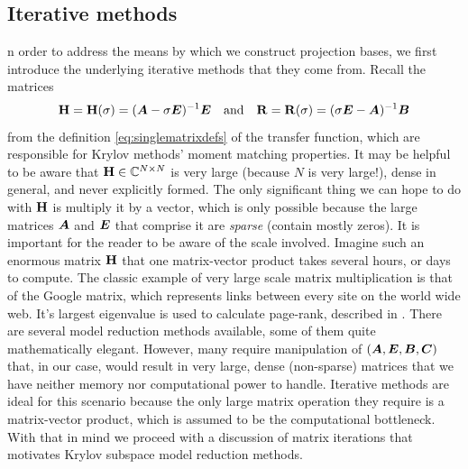 \subsection{Iterative methods}\label{sec:iterations}
n order to address the means by which we construct projection bases, we first introduce the underlying iterative methods that they come from.  Recall the matrices 
\[
\textbf{\textup{H}}=\textbf{\textup{H}}(\sigma) = (\bm{A} - \sigma \bm{E})^{-1}\bm{E}   \quad \text{and} \quad \textbf{\textup{R}}=\textbf{\textup{R}}(\sigma) =  (\sigma \bm{E}-\bm{A})^{-1}\bm{B}
\]
from the definition \eqref{eq:singlematrixdefs} of the transfer function,  which are responsible for Krylov methods' moment matching properties.  It may be helpful to be aware  that $\textbf{\textup{H}}\in\mathbb{C}^{N\times N}$ is very large (because $N$ is very large!), dense in general,  and never explicitly formed.   The only significant thing we can hope to do with $\textbf{\textup{H}}$ is multiply it by a vector, which is only possible because the large matrices $\bm{A}$ and $\bm{E}$ that comprise it are \emph{sparse} (contain mostly zeros).  It is important for the reader to be aware of the scale involved.  Imagine such an enormous matrix $\textbf{\textup{H}}$ that one matrix-vector product takes several hours, or days to compute.  The classic example of very large scale matrix multiplication is that of the Google matrix, which represents links between every site on the world wide web. It's largest eigenvalue is used to calculate page-rank, described in \cite{pagerank}.   There are several model reduction methods available, some of them quite mathematically elegant.  However, many require manipulation of $(\bm{A},\bm{E},\bm{B},\bm{C})$ that, in our case, would result  in very large, dense (non-sparse) matrices that we have neither memory nor computational power to handle.  Iterative methods are ideal for this scenario because the only large matrix operation they require is a matrix-vector product, which is assumed to be the computational bottleneck.  With that in mind we proceed with a discussion of matrix iterations that motivates Krylov subspace model reduction methods.      

